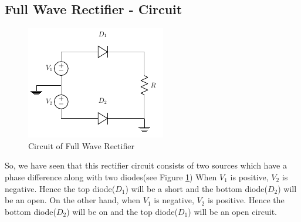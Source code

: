 		\subsection{Full Wave Rectifier - Circuit}
			\begin{figure}[h]
				\centering
				\includegraphics[width=0.5\linewidth]{img/exp7/6}
				\caption{Circuit of Full Wave Rectifier}
				\label{fig:fwr_fwrCircuit}
			\end{figure}
			So, we have seen that this rectifier circuit consists of two sources which have a phase difference along with two diodes(see Figure \ref{fig:fwr_fwrCircuit}) When $V_1$ is positive, $V_2$ is negative. Hence the top diode($D_1$) will be a short and the bottom diode($D_2$) will be an open.
			On the other hand, when $V_1$ is negative, $V_2$ is positive. Hence the bottom diode($D_2$) will be on and the top diode($D_1$) will be an open circuit.
			
